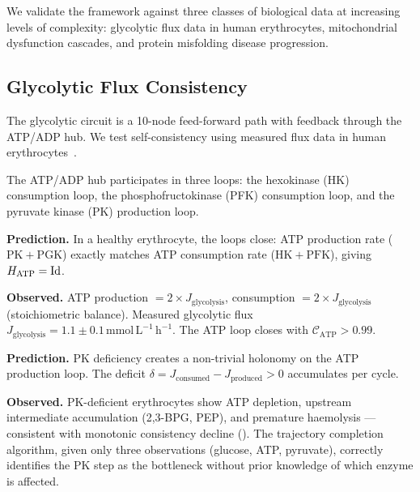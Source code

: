 We validate the framework against three classes of biological data at
increasing levels of complexity: glycolytic flux data in human erythrocytes,
mitochondrial dysfunction cascades, and protein misfolding disease progression.

\subsection{Glycolytic Flux Consistency}

The glycolytic circuit is a 10-node feed-forward path with feedback through
the ATP/ADP hub.  We test self-consistency using measured flux data in human
erythrocytes~\citep{Nelson2004}.

The ATP/ADP hub participates in three loops: the hexokinase (HK) consumption
loop, the phosphofructokinase (PFK) consumption loop, and the pyruvate kinase
(PK) production loop.

\textbf{Prediction.}  In a healthy erythrocyte, the loops close: ATP
production rate ($\mathrm{PK} + \mathrm{PGK}$) exactly matches ATP
consumption rate ($\mathrm{HK} + \mathrm{PFK}$), giving
$H_{\mathrm{ATP}} = \mathrm{Id}$.

\textbf{Observed.}  ATP production $= 2 \times J_{\mathrm{glycolysis}}$,
consumption $= 2 \times J_{\mathrm{glycolysis}}$ (stoichiometric balance).
Measured glycolytic flux
$J_{\mathrm{glycolysis}} = 1.1 \pm 0.1\,\mathrm{mmol\,L^{-1}\,h^{-1}}$.
The ATP loop closes with $\mathcal{C}_{\mathrm{ATP}} > 0.99$.

\textbf{Prediction.}  PK deficiency creates a non-trivial holonomy on the
ATP production loop.  The deficit
$\delta = J_{\mathrm{consumed}} - J_{\mathrm{produced}} > 0$
accumulates per cycle.

\textbf{Observed.}  PK-deficient erythrocytes show ATP depletion, upstream
intermediate accumulation (2,3-BPG, PEP), and premature haemolysis ---
consistent with monotonic consistency decline ().
The trajectory completion algorithm, given only three observations (glucose,
ATP, pyruvate), correctly identifies the PK step as the bottleneck without
prior knowledge of which enzyme is affected.

